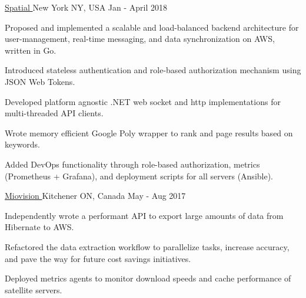 \begin{cventries}
  {\href{https://spatial.is}{Spatial \faExternalLink}} {New York NY, USA} {Jan -
    April 2018} {
    \begin{cvitems}
    \item Proposed and implemented a scalable and load-balanced backend
      architecture for user-management, real-time messaging, and data
      synchronization on AWS, written in Go.
    \item Introduced stateless authentication and role-based authorization
      mechanism using JSON Web Tokens.
    \item Developed platform agnostic .NET web socket and http implementations
      for multi-threaded API clients.
    \item Wrote memory efficient Google Poly wrapper to rank and page results
      based on keywords.
    \item Added DevOps functionality through role-based authorization, metrics
      (Prometheus + Grafana), and deployment scripts for all servers (Ansible).
    \end{cvitems}
  }
    
  {\href{https://miovision.com}{Miovision \faExternalLink}} {Kitchener ON,
    Canada} {May - Aug 2017} {
    \begin{cvitems}
    \item Independently wrote a performant API to export large amounts of data
      from Hibernate to AWS.
    \item Refactored the data extraction workflow to parallelize tasks, increase
      accuracy, and pave the way for future cost savings initiatives.
    \item Deployed metrics agents to monitor download speeds and cache
      performance of satellite servers.
    \end{cvitems}
  }

\end{cventries}
